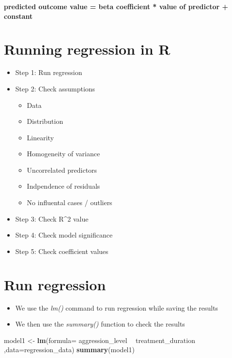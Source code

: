 \documentclass[
]{book}
\newenvironment{Shaded}{\begin{snugshade}}{\end{snugshade}}
\newcommand{\DataTypeTok}[1]{\textcolor[rgb]{0.13,0.29,0.53}{#1}}
\newcommand{\KeywordTok}[1]{\textcolor[rgb]{0.13,0.29,0.53}{\textbf{#1}}}
\newcommand{\NormalTok}[1]{#1}
\newcommand{\OperatorTok}[1]{\textcolor[rgb]{0.81,0.36,0.00}{\textbf{#1}}}
\newcommand{\StringTok}[1]{\textcolor[rgb]{0.31,0.60,0.02}{#1}}
\providecommand{\tightlist}{%
  \setlength{\itemsep}{0pt}\setlength{\parskip}{0pt}}
\begin{document}
\textbf{predicted outcome value = beta coefficient * value of predictor + constant }

\hypertarget{running-regression-in-r}{%
\section{Running regression in R}\label{running-regression-in-r}}

\begin{itemize}
\tightlist
\item
  Step 1: Run regression
\item
  Step 2: Check assumptions

  \begin{itemize}
  \tightlist
  \item
    Data
  \item
    Distribution
  \item
    Linearity
  \item
    Homogeneity of variance
  \item
    Uncorrelated predictors
  \item
    Indpendence of residuals
  \item
    No influental cases / outliers
  \end{itemize}
\item
  Step 3: Check R\^{}2 value
\item
  Step 4: Check model significance
\item
  Step 5: Check coefficient values
\end{itemize}

\hypertarget{run-regression}{%
\section{Run regression}\label{run-regression}}

\begin{itemize}
\tightlist
\item
  We use the \emph{lm()} command to run regression while saving the results
\item
  We then use the \emph{summary()} function to check the results
\end{itemize}

\begin{Shaded}
\begin{Highlighting}[]
\NormalTok{model1 <-}\StringTok{ }\KeywordTok{lm}\NormalTok{(}\DataTypeTok{formula=}\NormalTok{ aggression_level }\OperatorTok{~}\StringTok{ }\NormalTok{treatment_duration ,}\DataTypeTok{data=}\NormalTok{regression_data)}
\KeywordTok{summary}\NormalTok{(model1)}
\end{Highlighting}
\end{Shaded}
\end{document}
